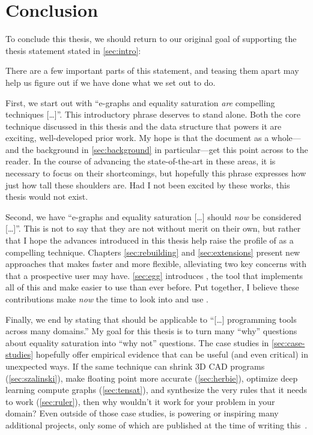 \chapter{Conclusion}%
\label{sec:conclusion}

To conclude this thesis,
 we should return to our
 original goal of
 supporting the thesis statement
 stated in \autoref{sec:intro}:
\begin{quote}
  \it\Thesisstmt
\end{quote}
There are a few important parts of this statement,
 and teasing them apart
 may help us figure out if
 we have done what we set out to do.

First, we start out with
 ``e-graphs and equality saturation \emph{are} compelling techniques [\ldots]''.
This introductory phrase deserves to stand alone.
Both the core technique discussed in this thesis
 and the data structure that powers it
 are exciting, well-developed prior work.
My hope is that the document as a whole---and the
 background in \autoref{sec:background} in
 particular---get this point across to the reader.
In the course of advancing the state-of-the-art
 in these areas,
 it is necessary to focus on their shortcomings,
 but hopefully this phrase expresses
 how just how tall these shoulders are.
Had I not been excited by these works,
 this thesis would not exist.

Second, we have
 ``e-graphs and equality saturation [\ldots] should \emph{now} be considered [\ldots]''.
This is not to say that they are not without merit on their own,
 but rather that I hope the advances introduced in this thesis
 help raise the profile of \eqsat as a compelling technique.
Chapters \ref{sec:rebuilding} and \ref{sec:extensions}
 present new approaches that makes \eqsat faster and more flexible,
 alleviating two key concerns with that a prospective user may have.
\autoref{sec:egg} introduces \egg,
 the tool that implements all of this
 and make \eqsat easier to use than ever before.
Put together, I believe these contributions make \emph{now}
 the time to look into and use \eqsat.

Finally, we end by stating that \eqsat should be applicable to
 ``[\ldots] programming tools across many domains.''
My goal for this thesis is to turn
 many ``why'' questions about equality saturation into ``why not'' questions.
The case studies in \autoref{sec:case-studies}
 hopefully offer empirical evidence that
 \eqsat can be useful (and even critical)
 in unexpected ways.
If the same technique can shrink 3D CAD programs (\autoref{sec:szalinski}),
 make floating point more accurate (\autoref{sec:herbie}),
 optimize deep learning compute graphs (\autoref{sec:tensat}),
 and synthesize the very rules that it needs to work (\autoref{sec:ruler}),
 then why wouldn't it work for your problem in your domain?
Even outside of those case studies,
 \egg is powering or inspiring many additional projects,
 only some of which are published at the time of writing
 this~\cite{spores, Cheli2021, vanhattum2021vectorization}.


